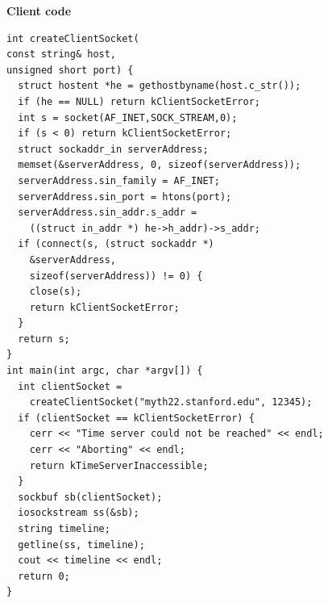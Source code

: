 \documentclass{article}
\begin{document}
\begin{multicols}{2}
  {\bf Client code} {\scriptsize
  \begin{verbatim}
int createClientSocket(
const string& host,
unsigned short port) {
  struct hostent *he = gethostbyname(host.c_str());
  if (he == NULL) return kClientSocketError;
  int s = socket(AF_INET,SOCK_STREAM,0);
  if (s < 0) return kClientSocketError;
  struct sockaddr_in serverAddress;
  memset(&serverAddress, 0, sizeof(serverAddress));
  serverAddress.sin_family = AF_INET;
  serverAddress.sin_port = htons(port);
  serverAddress.sin_addr.s_addr =
    ((struct in_addr *) he->h_addr)->s_addr;
  if (connect(s, (struct sockaddr *)
    &serverAddress,
    sizeof(serverAddress)) != 0) {
    close(s);
    return kClientSocketError;
  }
  return s;
}
int main(int argc, char *argv[]) {
  int clientSocket =
    createClientSocket("myth22.stanford.edu", 12345);
  if (clientSocket == kClientSocketError) {
    cerr << "Time server could not be reached" << endl;
    cerr << "Aborting" << endl;
    return kTimeServerInaccessible;
  }
  sockbuf sb(clientSocket);
  iosockstream ss(&sb);
  string timeline;
  getline(ss, timeline);
  cout << timeline << endl;
  return 0;
} \end{verbatim} }


\end{multicols}
\end{document}
